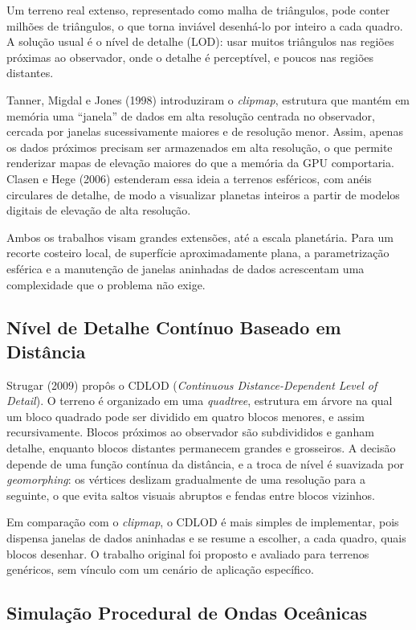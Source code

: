 \documentclass[conference]{IEEEtran}
\begin{document}
Um terreno real extenso, representado como malha de triângulos, pode
conter milhões de triângulos, o que torna inviável desenhá-lo por inteiro a
cada quadro. A solução usual é o nível de detalhe (LOD): usar muitos
triângulos nas regiões próximas ao observador, onde o detalhe é
perceptível, e poucos nas regiões distantes.

Tanner, Migdal e Jones (1998) introduziram o \emph{clipmap}, estrutura que
mantém em memória uma ``janela'' de dados em alta resolução centrada no
observador, cercada por janelas sucessivamente maiores e de resolução
menor. Assim, apenas os dados próximos precisam ser armazenados em alta
resolução, o que permite renderizar mapas de elevação maiores do que a
memória da GPU comportaria. Clasen e Hege (2006) estenderam essa ideia a
terrenos esféricos, com anéis circulares de detalhe, de modo a visualizar
planetas inteiros a partir de modelos digitais de elevação de alta
resolução.

Ambos os trabalhos visam grandes extensões, até a escala planetária. Para
um recorte costeiro local, de superfície aproximadamente plana, a
parametrização esférica e a manutenção de janelas aninhadas de dados
acrescentam uma complexidade que o problema não exige.

\subsection{Nível de Detalhe Contínuo Baseado em Distância}
\label{sub:cdlod-rel}

Strugar (2009) propôs o CDLOD (\emph{Continuous Distance-Dependent Level of
Detail}). O terreno é organizado em uma \emph{quadtree}, estrutura em
árvore na qual um bloco quadrado pode ser dividido em quatro blocos
menores, e assim recursivamente. Blocos próximos ao observador são
subdivididos e ganham detalhe, enquanto blocos distantes permanecem grandes
e grosseiros. A decisão depende de uma função contínua da distância, e a
troca de nível é suavizada por \emph{geomorphing}: os vértices deslizam
gradualmente de uma resolução para a seguinte, o que evita saltos visuais
abruptos e fendas entre blocos vizinhos.

Em comparação com o \emph{clipmap}, o CDLOD é mais simples de implementar,
pois dispensa janelas de dados aninhadas e se resume a escolher, a cada
quadro, quais blocos desenhar. O trabalho original foi proposto e avaliado
para terrenos genéricos, sem vínculo com um cenário de aplicação
específico.

\subsection{Simulação Procedural de Ondas Oceânicas}
\label{sub:ondas-rel}
\end{document}
